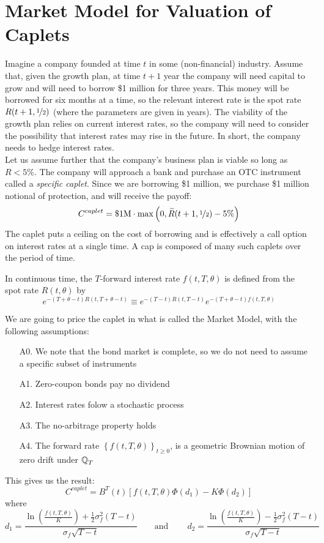 \documentclass[11pt]{article}
\begin{document}
\section{Market Model for Valuation of Caplets}

Imagine a company founded at time $t$ in some (non-financial) industry. Assume that, given the growth plan, at time $t + 1$ year the company will need capital to grow and will need to borrow \$1 million for three years. This money will be borrowed for six months at a time, so the relevant interest rate is the spot rate $R(t+1, \nicefrac{1}{2})$ (where the parameters are given in years).  The viability of the growth plan relies on current interest rates, so the company will need to consider the possibility that interest rates may rise in the future. In short, the company needs to hedge interest rates. \\

Let us assume further that the company's business plan is viable so long as $R < 5\%$. The company will approach a bank and purchase an OTC instrument called a {\em specific caplet}. Since we are borrowing \$1 million, we purchase \$1 million notional of protection, and will receive the payoff:
$$ C^{caplet} = \text{\$1M} \cdot \max\left(0, \widetilde{R}(t+1, \nicefrac{1}{2}) - 5\% \right)$$
The caplet puts a ceiling on the cost of borrowing and is effectively a call option on interest rates at a single time. A cap is composed of many such caplets over the period of time.\\

\begin{definition} In continuous time, the $T$-forward interest rate $f(t, T, \theta)$ is defined from the spot rate $R(t, \theta)$ by
$$ e^{-(T+\theta-t)R(t, T+\theta-t)}\equiv e^{-(T-t)R(t, T-t)}e^{-(T+\theta-t)f(t, T, \theta)}$$
\end{definition}

We are going to price the caplet in what is called the Market Model, with the following assumptions:
\begin{enumerate}
\item[A0.] We note that the bond market is complete, so we do not need to assume a specific subset of instruments
\item[A1.] Zero-coupon bonds pay no dividend
\item[A2.] Interest rates folow a stochastic process
\item[A3.] The no-arbitrage property holds
\item[A4.] The forward rate $\left\{f(t, T, \theta)\right\}_{t \geq 0}$, is a geometric Brownian motion of zero drift under $\operatorname{\mathbb Q}_T$
\end{enumerate}
This gives us the result:
$$ C^{caplet} = B^T(t)\left[ f(t, T, \theta) \Phi(d_1) - K \Phi(d_2)\right] $$
where
$$d_1 = \frac{\ln \left( \frac{f(t, T, \theta)}{K}\right) + \frac{1}{2}\sigma_f^2(T-t)}{\sigma_f \sqrt{T-t}} \qquad \text{and} \qquad \ d_2 = \frac{\ln \left( \frac{f(t, T, \theta)}{K}\right) - \frac{1}{2}\sigma_f^2(T-t)}{\sigma_f \sqrt{T-t}}$$
\end{document}
